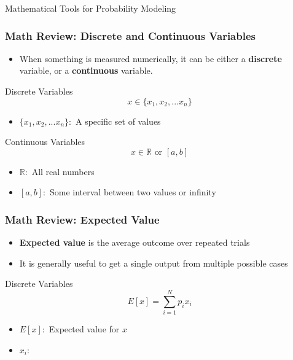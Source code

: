 \documentclass[handout, 11pt]{beamer}
\begin{document}
\begin{section}{Mathematical Tools for Probability Modeling}
\begin{frame}
\frametitle{Math Review: Discrete and Continuous Variables}
\begin{itemize}
\item When something is measured numerically, it can be either a
\textbf{discrete}
variable, or a
\textbf{continuous}
variable.
\end{itemize}
\begin{block}{Discrete Variables}
\begin{equation}
	x \in \{x_1, x_2, ... x_n\}
\end{equation}
\vspace{-0.4cm}
\begin{itemize}
\item $\{x_1, x_2, ... x_n\}:$
A specific set of values
\end{itemize}
\end{block}
\begin{block}{Continuous Variables}
\begin{equation}
	x \in \mathbb{R} \text{ or } [a, b]
\end{equation}
\vspace{-0.4cm}
\begin{itemize}
\item $\mathbb{R}:$
All real numbers
\item $[a, b]:$
Some interval between two values or infinity
\end{itemize}
\end{block}
\end{frame}
\begin{frame}
\frametitle{Math Review: Expected Value}
\scriptsize
\begin{itemize}
\item \textbf{Expected value}
is the average outcome over repeated trials
\item It is generally useful to get a single output from multiple possible cases
\end{itemize}
\begin{block}{Discrete Variables}
\begin{equation}
	E[x] = \sum_{i=1}^{N} p_i x_i
\end{equation}
\vspace{-0.4cm}
\begin{itemize}
\item $E[x]:$
Expected value for
$x$
\item $x_i:$

\end{itemize}
\end{block}
\end{frame}
\end{section}
\end{document}
